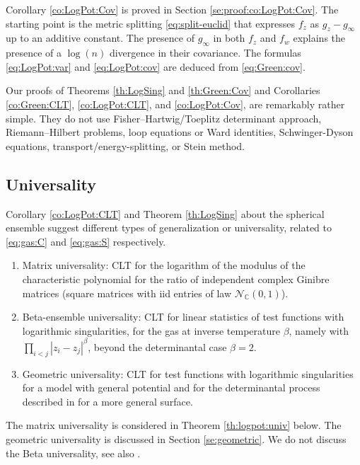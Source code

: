 \documentclass[10pt,reqno]{amsart}
\numberwithin{equation}{section}
\numberwithin{figure}{section}
\theoremstyle{plain}
\newcommand{\<}{\langle}
\renewcommand{\>}{\rangle}
\begin{document}
Corollary \ref{co:LogPot:Cov} is proved in Section \ref{se:proof:co:LogPot:Cov}. The starting point is the metric splitting \eqref{eq:split-euclid} that expresses $f_z$ as $g_z-g_\infty$ up to an additive constant. The presence of $g_\infty$ in both $f_z$ and $f_w$ explains the presence of a $\log(n)$ divergence in their covariance. The formulas 
\eqref{eq:LogPot:var} and \eqref{eq:LogPot:cov} are deduced from \eqref{eq:Green:cov}.

\bigskip

Our proofs of Theorems \ref{th:LogSing} and \ref{th:Green:Cov} and Corollaries \ref{co:Green:CLT}, \ref{co:LogPot:CLT}, and \ref{co:LogPot:Cov}, are remarkably rather simple.
%
They do not use Fisher--Hartwig/Toeplitz determinant approach, Riemann--Hilbert problems, loop equations or Ward identities, Schwinger-Dyson equations, transport/energy-splitting, or Stein method. 

\subsection{Universality}

Corollary \ref{co:LogPot:CLT} and Theorem \ref{th:LogSing} about the spherical ensemble suggest different types of generalization or universality, related to \eqref{eq:gas:C} and \eqref{eq:gas:S} respectively.
\begin{enumerate}
    \item Matrix universality: CLT for the logarithm of the modulus of the characteristic polynomial for the ratio of independent complex Ginibre matrices (square matrices with iid entries of law $\mathcal{N}_{\mathbb{C}}(0,1)$).
    \item Beta-ensemble universality: CLT for linear statistics of test functions with logarithmic singularities, for the gas at inverse temperature $\beta$, namely with $\prod_{i<j}|z_i-z_j|^\beta$, beyond the determinantal case $\beta=2$.
    \item Geometric universality: CLT for test functions with logarithmic singularities for a model with general potential and for the determinantal process described in \cite{zbMATH06113080} for a more general surface.
\end{enumerate}
The matrix universality is considered in Theorem \ref{th:logpot:univ} below. The geometric universality is discussed in Section \ref{se:geometric}. We do not discuss the Beta universality, see also \cite{MR3788208,zbMATH07431029,MR4552960}.

\bigskip
\end{document}

